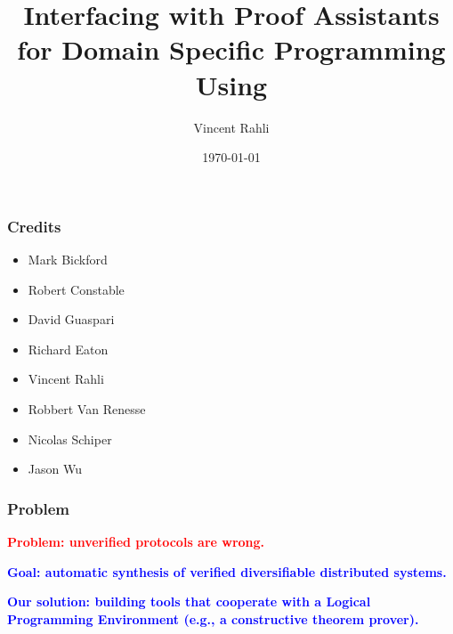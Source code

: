 \documentclass[12pt,red]{beamer}
\title[\eml]{Interfacing with Proof Assistants for Domain Specific Programming Using \eml}
\author[\prl\ team]{{\small Vincent Rahli}}
\institute{Cornell University}
\date{\today}
\newcommand{\cemph}[1]{\textcolor{blue}{\textbf{#1}}}
\newcommand{\remph}[1]{\textcolor{red}{\textbf{#1}}}
\begin{document}
\begin{frame}
  \titlepage
\end{frame}


\begin{frame}
  \frametitle{Credits}
  \begin{itemize}
  \item Mark Bickford
  \item Robert Constable
  \item David Guaspari
  \item Richard Eaton
  \item Vincent Rahli
  \item Robbert Van Renesse
  \item Nicolas Schiper
  \item Jason Wu
  \end{itemize}
\end{frame}


\begin{frame}
  \frametitle{Problem}

  \remph{Problem: unverified protocols are wrong.}

  \vspace{0.2in}

  \cemph{Goal: automatic synthesis of verified diversifiable
    distributed systems.}

  \vspace{0.2in}

  \cemph{Our solution: building tools that cooperate with a Logical
    Programming Environment (e.g., a constructive theorem prover).}
\end{frame}
\end{document}
